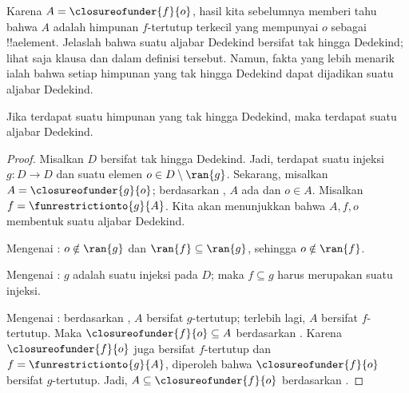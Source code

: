 \documentclass[../../../include/open-logic-section]{subfiles}
\begin{document}
Karena $A = \closureofunder{f}{o}$, hasil kita sebelumnya memberi tahu bahwa
$A$ adalah himpunan $f$-tertutup terkecil yang mempunyai $o$ sebagai
!!a{element}. Jelaslah bahwa suatu aljabar Dedekind bersifat tak hingga
Dedekind; lihat saja klausa  dan
 dalam definisi tersebut. Namun, fakta yang lebih
menarik ialah bahwa setiap himpunan yang tak hingga Dedekind dapat dijadikan
suatu aljabar Dedekind.

\begin{thm}
Jika terdapat suatu himpunan yang tak hingga Dedekind, maka terdapat suatu
aljabar Dedekind.
\end{thm}

\begin{proof}
Misalkan $D$ bersifat tak hingga Dedekind. Jadi, terdapat suatu injeksi
$g \colon D \to D$ dan suatu elemen $o \in D \setminus \ran{g}$.
Sekarang, misalkan $A = \closureofunder{g}{o}$; berdasarkan
, $A$ ada dan $o \in A$. Misalkan
$f = \funrestrictionto{g}{A}$. Kita akan menunjukkan bahwa $A, f, o$
membentuk suatu aljabar Dedekind.

Mengenai : $o \notin \ran{g}$ dan $\ran{f}
\subseteq \ran{g}$, sehingga $o\notin \ran{f}$.

Mengenai : $g$ adalah suatu injeksi pada $D$; maka
$f \subseteq g$ harus merupakan suatu injeksi.

Mengenai : berdasarkan ,
$A$ bersifat $g$-tertutup; terlebih lagi, $A$ bersifat $f$-tertutup. Maka
$\closureofunder{f}{o} \subseteq A$ berdasarkan .
Karena $\closureofunder{f}{o}$ juga bersifat $f$-tertutup dan
$f = \funrestrictionto{g}{A}$, diperoleh bahwa $\closureofunder{f}{o}$
bersifat $g$-tertutup. Jadi, $A \subseteq \closureofunder{f}{o}$ berdasarkan
.
\end{proof}
\end{document}
